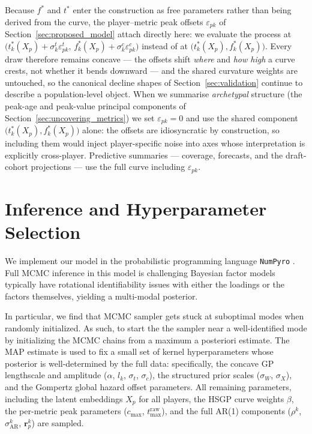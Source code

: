 \documentclass[aoas]{imsart}
\begin{document}
Because $f^{*}$ and $t^{*}$ enter the construction as free parameters rather than being derived from the curve, the player--metric peak offsets $\varepsilon_{pk}$ of Section~\ref{sec:proposed_model} attach directly here: we evaluate the process at $\big(t^{*}_k(X_p) + \sigma^t_k \varepsilon^t_{pk},\, f^{*}_k(X_p) + \sigma^c_k \varepsilon^c_{pk}\big)$ instead of at $\big(t^{*}_k(X_p), f^{*}_k(X_p)\big)$.  Every draw therefore remains concave --- the offsets shift \emph{where} and \emph{how high} a curve crests, not whether it bends downward --- and the shared curvature weights are untouched, so the canonical decline shapes of Section~\ref{sec:validation} continue to describe a population-level object.  When we summarise \emph{archetypal} structure (the peak-age and peak-value principal components of Section~\ref{sec:uncovering_metrics}) we set $\varepsilon_{pk} = 0$ and use the shared component $\big(t^{*}_k(X_p), f^{*}_k(X_p)\big)$ alone: the offsets are idiosyncratic by construction, so including them would inject player-specific noise into axes whose interpretation is explicitly cross-player.  Predictive summaries --- coverage, forecasts, and the draft-cohort projections --- use the full curve including $\varepsilon_{pk}$.
























\section{Inference and Hyperparameter Selection}
\label{sec:inference}

We implement our model in the probabilistic programming language \texttt{NumPyro} \cite{numpyro}. Full MCMC inference in this model is challenging Bayesian factor models typically have rotational identifiability issues with either the loadings or the factors themselves, yielding a multi-modal posterior. 


In particular, we find that MCMC sampler gets stuck at suboptimal modes when randomly initialized.  As such, to start the the sampler near a well-identified mode by initializing the MCMC chains from a maximum a posteriori estimate. The MAP estimate is used to fix a small set of kernel hyperparameters whose posterior is well-determined by the full data: specifically, the concave GP lengthscale and amplitude ($\alpha$, $l_k$, $\sigma_t$, $\sigma_c$), the structured prior scales ($\sigma_W$, $\sigma_X$), and the Gompertz global hazard offset parameters. All remaining parameters, including the latent embeddings $X_p$ for all players, the HSGP curve weights $\beta$, the per-metric peak parameters ($c_{\max}$, $t_{\max}^{\text{raw}}$), and the full AR(1) components ($\rho^k$, $\sigma^k_{\mathrm{AR}}$, $\mathbf{r}^k_p$) are sampled. 
\end{document}
